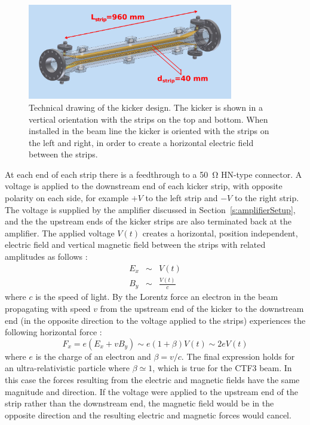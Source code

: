 \begin{figure}
  \centering
  \includegraphics[width=0.8\textwidth]{Figures/optics/kickerSchematic}
  \caption{Technical drawing of the kicker design. The kicker is shown in a vertical orientation with the strips on the top and bottom. When installed in the beam line the kicker is oriented with the strips on the left and right, in order to create a horizontal electric field between the strips.}
  \label{f:kickerSchematic}
\end{figure}

At each end of each strip there is a feedthrough to a 50~\(\mathrm{\Omega}\) HN-type connector. A voltage is applied to the downstream end of each kicker strip, with opposite polarity on each side, for example \(+V\) to the left strip and \(-V\) to the right strip. The voltage is supplied by the amplifier discussed in Section~\ref{s:amplifierSetup}, and the the upstream ends of the kicker strips are also terminated back at the amplifier. The applied voltage \(V(t)\) creates a horizontal, position independent, electric field and vertical magnetic field between the strips with related amplitudes as follows \cite{byrdKicker}:
\begin{eqnarray}
E_x &\sim& V(t) \\
B_y &\sim& \frac{V(t)}{c}
\end{eqnarray}
where \(c\) is the speed of light. By the Lorentz force an electron in the beam propagating with speed \(v\) from the upstream end of the kicker to the downstream end (in the opposite direction to the voltage applied to the strips) experiences the following horizontal force \cite{byrdKicker}:
\begin{equation}
F_x = e(E_x + vB_y) \sim e(1+\beta)V(t) \sim 2eV(t)
\end{equation}
where \(e\) is the charge of an electron and \(\beta = v/c\). The final expression holds for an ultra-relativistic particle where \(\beta \simeq 1\), which is true for the CTF3 beam. In this case the forces resulting from the electric and magnetic fields have the same magnitude and direction. If the voltage were applied to the upstream end of the strip rather than the downstream end, the magnetic field would be in the opposite direction and the resulting electric and magnetic forces would cancel. 

